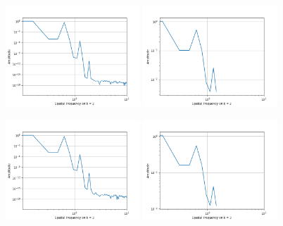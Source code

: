 \documentclass[12pt]{article}
\begin{document}
\begin{figure}[H]
    \centering
    \includegraphics[width=0.45\textwidth]{figures/P2Fn1ub02.png}
    \includegraphics[width=0.45\textwidth]{figures/P2Fn1b02.png}
    \label{IGs.jpg}
\end{figure}


\begin{figure}[H]
    \centering
    \includegraphics[width=0.45\textwidth]{figures/P2Fn1ub03.png}
    \includegraphics[width=0.45\textwidth]{figures/P2Fn1b03.png}
    \label{IGs.jpg}
\end{figure}
\end{document}
